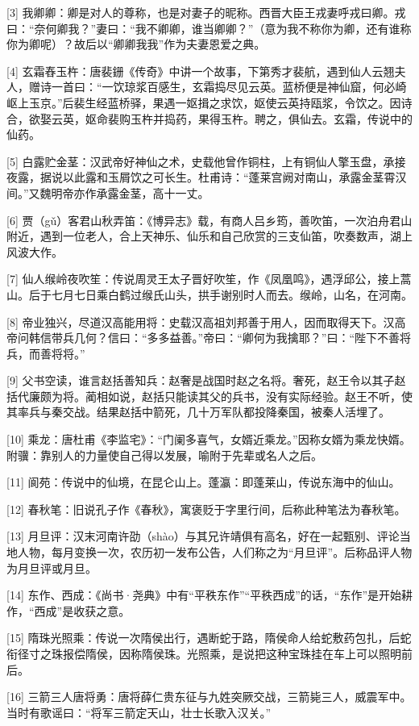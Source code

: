 \documentclass[12pt,UTF8]{ctexbook}
\begin{document}
[3] 我卿卿：卿是对人的尊称，也是对妻子的昵称。西晋大臣王戎妻呼戎曰卿。戎曰：“奈何卿我？”妻曰：“我不卿卿，谁当卿卿？”（意为我不称你为卿，还有谁称你为卿呢）？故后以“卿卿我我”作为夫妻恩爱之典。

[4] 玄霜舂玉杵：唐裴銏《传奇》中讲一个故事，下第秀才裴航，遇到仙人云翘夫人，赠诗一首曰：“一饮琼浆百感生，玄霜捣尽见云英。蓝桥便是神仙窟，何必崎岖上玉京。”后裴生经蓝桥驿，果遇一妪揖之求饮，妪使云英持瓯浆，令饮之。因诗合，欲娶云英，妪命裴购玉杵并捣药，果得玉杵。聘之，俱仙去。玄霜，传说中的仙药。

[5] 白露贮金茎：汉武帝好神仙之术，史载他曾作铜柱，上有铜仙人擎玉盘，承接夜露，据说以此露和玉屑饮之可长生。杜甫诗：“蓬莱宫阙对南山，承露金茎霄汉间。”又魏明帝亦作承露金茎，高十一丈。

[6] 贾（gǔ）客君山秋弄笛：《博异志》载，有商人吕乡筠，善吹笛，一次泊舟君山附近，遇到一位老人，合上天神乐、仙乐和自己欣赏的三支仙笛，吹奏数声，湖上风波大作。

[7] 仙人缑岭夜吹笙：传说周灵王太子晋好吹笙，作《凤凰鸣》，遇浮邱公，接上蒿山。后于七月七日乘白鹤过缑氏山头，拱手谢别时人而去。缑岭，山名，在河南。

[8] 帝业独兴，尽道汉高能用将：史载汉高祖刘邦善于用人，因而取得天下。汉高帝问韩信带兵几何？信曰：“多多益善。”帝曰：“卿何为我擒耶？”曰：“陛下不善将兵，而善将将。”

[9] 父书空读，谁言赵括善知兵：赵奢是战国时赵之名将。奢死，赵王令以其子赵括代廉颇为将。蔺相如说，赵括只能读其父的兵书，没有实际经验。赵王不听，使其率兵与秦交战。结果赵括中箭死，几十万军队都投降秦国，被秦人活埋了。

[10] 乘龙：唐杜甫《李监宅》：“门阑多喜气，女婿近乘龙。”因称女婿为乘龙快婿。附骥：靠别人的力量使自己得以发展，喻附于先辈或名人之后。

[11] 阆苑：传说中的仙境，在昆仑山上。蓬瀛：即蓬莱山，传说东海中的仙山。

[12] 春秋笔：旧说孔子作《春秋》，寓褒贬于字里行间，后称此种笔法为春秋笔。

[13] 月旦评：汉末河南许劭（shào）与其兄许靖俱有高名，好在一起甄别、评论当地人物，每月变换一次，农历初一发布公告，人们称之为“月旦评”。后称品评人物为月旦评或月旦。

[14] 东作、西成：《尚书·尧典》中有“平秩东作”“平秩西成”的话，“东作”是开始耕作，“西成”是收获之意。

[15] 隋珠光照乘：传说一次隋侯出行，遇断蛇于路，隋侯命人给蛇敷药包扎，后蛇衔径寸之珠报偿隋侯，因称隋侯珠。光照乘，是说把这种宝珠挂在车上可以照明前后。

[16] 三箭三人唐将勇：唐将薛仁贵东征与九姓突厥交战，三箭毙三人，威震军中。当时有歌谣曰：“将军三箭定天山，壮士长歌入汉关。”
\end{document}
